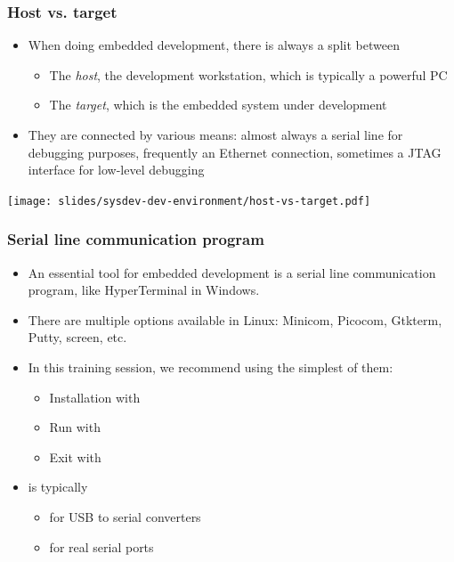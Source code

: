 \begin{frame}
  \frametitle{Host vs. target}
  \begin{itemize}
  \item When doing embedded development, there is always a split between
    \begin{itemize}
    \item The {\em host}, the development workstation, which is
      typically a powerful PC
    \item The {\em target}, which is the embedded system under
      development
    \end{itemize}
  \item They are connected by various means: almost always a serial
    line for debugging purposes, frequently an Ethernet connection,
    sometimes a JTAG interface for low-level debugging
  \end{itemize}
  \begin{center}
    \texttt{[image: slides/sysdev-dev-environment/host-vs-target.pdf]}
  \end{center}
\end{frame}

\begin{frame}
  \frametitle{Serial line communication program}
  \begin{itemize}
  \item An essential tool for embedded development is a serial line
    communication program, like HyperTerminal in Windows.
  \item There are multiple options available in Linux: Minicom,
    Picocom, Gtkterm, Putty, screen, etc.
  \item In this training session, we recommend using the simplest of
    them: 
    \begin{itemize}
    \item Installation with 
    \item Run with 
    \item Exit with 
    \end{itemize}
  \item {} is typically
    \begin{itemize}
    \item {} for USB to serial converters
    \item {} for real serial ports
    \end{itemize}
  \end{itemize}
\end{frame}

